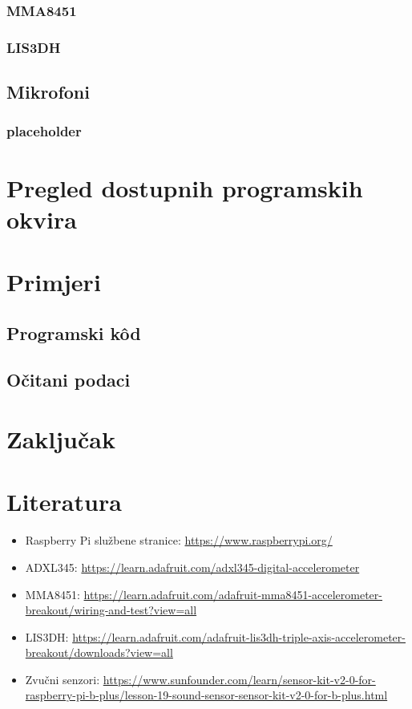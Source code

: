 \documentclass[12pt,a4paper]{article}
\begin{document}
		\subsubsection{MMA8451}
		\subsubsection{LIS3DH}

	\subsection{Mikrofoni}
		\subsubsection{placeholder}
\newpage
\section{Pregled dostupnih programskih okvira}

\newpage
\section{Primjeri}
	\subsection{Programski kôd}
	\subsection{Očitani podaci}

\newpage
\section{Zaključak}

\newpage
\section{Literatura}

\begin{itemize}
	\item Raspberry Pi službene stranice: \url{https://www.raspberrypi.org/}
	\item ADXL345: \url{https://learn.adafruit.com/adxl345-digital-accelerometer}
	\item MMA8451: \url{https://learn.adafruit.com/adafruit-mma8451-accelerometer-breakout/wiring-and-test?view=all}
	\item LIS3DH: \url{https://learn.adafruit.com/adafruit-lis3dh-triple-axis-accelerometer-breakout/downloads?view=all}
	\item Zvučni senzori: \url{https://www.sunfounder.com/learn/sensor-kit-v2-0-for-raspberry-pi-b-plus/lesson-19-sound-sensor-sensor-kit-v2-0-for-b-plus.html}
\end{itemize}
\end{document}
